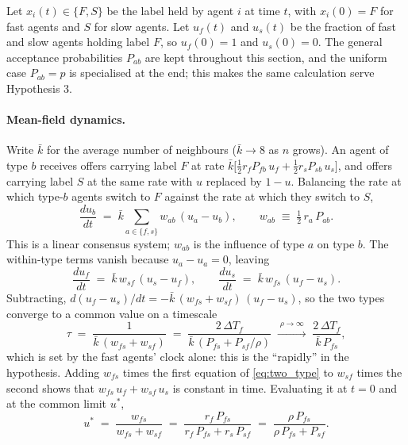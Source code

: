 \documentclass{article}
\newcommand{\Pab}[2]{P_{#1#2}}      %
\newcommand{\dTf}{\Delta T_f}
\begin{document}
Let $x_i(t) \in \{F, S\}$ be the label held by agent $i$ at time $t$, with $x_i(0) = F$ for fast agents and $S$ for slow agents. Let $u_f(t)$ and $u_s(t)$ be the fraction of fast and slow agents holding label $F$, so $u_f(0) = 1$ and $u_s(0) = 0$. The general acceptance probabilities $\Pab{a}{b}$ are kept throughout this section, and the uniform case $\Pab{a}{b} = p$ is specialised at the end; this makes the same calculation serve Hypothesis 3.

\paragraph{Mean-field dynamics.} Write $\bar k$ for the average number of neighbours ($\bar k \to 8$ as $n$ grows). An agent of type $b$ receives offers carrying label $F$ at rate $\bar k\bigl[\tfrac12 r_f \Pab{f}{b}\, u_f + \tfrac12 r_s \Pab{s}{b}\, u_s\bigr]$, and offers carrying label $S$ at the same rate with $u$ replaced by $1-u$. Balancing the rate at which type-$b$ agents switch to $F$ against the rate at which they switch to $S$,
\begin{equation}
\frac{du_b}{dt} \;=\; \bar k \sum_{a \in \{f,s\}} w_{ab}\,(u_a - u_b), \qquad w_{ab} \;\equiv\; \tfrac12\, r_a\, \Pab{a}{b}.
\label{eq:consensus}
\end{equation}
This is a linear consensus system; $w_{ab}$ is the influence of type $a$ on type $b$. The within-type terms vanish because $u_a - u_a = 0$, leaving
\begin{equation}
\frac{du_f}{dt} \;=\; \bar k\, w_{sf}\,(u_s - u_f), \qquad
\frac{du_s}{dt} \;=\; \bar k\, w_{fs}\,(u_f - u_s).
\label{eq:two_type}
\end{equation}
Subtracting, $d(u_f - u_s)/dt = -\bar k\,(w_{fs} + w_{sf})\,(u_f - u_s)$, so the two types converge to a common value on a timescale
\begin{equation}
\tau \;=\; \frac{1}{\bar k\,(w_{fs} + w_{sf})} \;=\; \frac{2\,\dTf}{\bar k\,(\Pab{f}{s} + \Pab{s}{f}/\rho)} \;\xrightarrow{\;\rho \to \infty\;}\; \frac{2\,\dTf}{\bar k\,\Pab{f}{s}},
\label{eq:tau}
\end{equation}
which is set by the fast agents' clock alone: this is the ``rapidly'' in the hypothesis. Adding $w_{fs}$ times the first equation of \eqref{eq:two_type} to $w_{sf}$ times the second shows that $w_{fs}\,u_f + w_{sf}\,u_s$ is constant in time. Evaluating it at $t = 0$ and at the common limit $u^\ast$,
\begin{equation}
u^\ast \;=\; \frac{w_{fs}}{w_{fs} + w_{sf}} \;=\; \frac{r_f\, \Pab{f}{s}}{r_f\, \Pab{f}{s} + r_s\, \Pab{s}{f}}
\;=\; \frac{\rho\, \Pab{f}{s}}{\rho\, \Pab{f}{s} + \Pab{s}{f}}.
\label{eq:ustar}
\end{equation}
\end{document}
